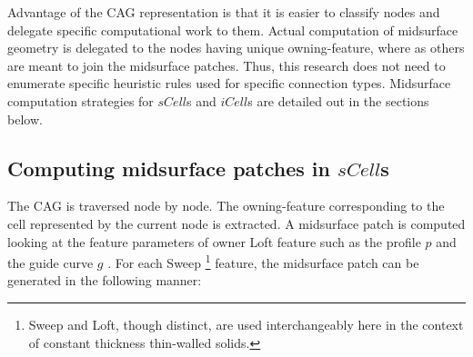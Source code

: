 Advantage of the CAG representation is that it is easier to classify nodes and delegate specific computational work to them. Actual computation of midsurface geometry is delegated to the nodes having unique owning-feature, where as others are meant to join the midsurface patches. Thus, this research does not need to enumerate specific heuristic rules used for specific connection types. Midsurface computation strategies for $sCell$s and  $iCell$s are detailed out in the sections below.
			
\subsection{Computing midsurface patches in $sCell$s}
\label{sec:scell}
The CAG is traversed node by node. The owning-feature corresponding to the cell represented by the current node is extracted. A midsurface patch is computed looking at the feature parameters of owner Loft feature such as the profile $p$ and the guide curve $g$ \cite{YogeshIITG2014}. %
%
%
%
%
For each Sweep \footnote{ Sweep and Loft, though distinct, are used interchangeably here in the context of constant thickness thin-walled solids.} feature, the midsurface patch can be generated in the following manner: 

%
%

